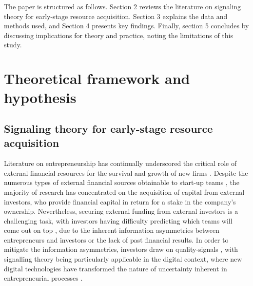 \documentclass[12pt]{article}
\begin{document}
The paper is structured as follows. Section 2 reviews the literature on signaling theory for early-stage resource acquisition. Section 3 explains the data and methods used, and Section 4 presents key findings. Finally, section 5 concludes by discussing implications for theory and practice, noting the limitations of this study.


\section{Theoretical framework and hypothesis}

\subsection{Signaling theory for early-stage resource acquisition}

Literature on entrepreneurship has continually underscored the critical role of external financial resources for the survival and growth of new firms \citep{cooper1994initial}. Despite the numerous types of external financial sources obtainable to start-up teams \citep{drover2017review, klein2020start}, the majority of research has concentrated on the acquisition of capital from external investors, who provide financial capital in return for a stake in the company's ownership. Nevertheless, securing external funding from external investors is a challenging task, with investors having difficulty predicting which teams will come out on top \citep{ghassemiautomated, duhigg2016google}, due to the inherent information asymmetries between entrepreneurs and investors or the lack of past financial results. In order to mitigate the information asymmetries, investors draw on quality-signals \citep{spence1978job, ko2018signaling}, with signalling theory being particularly applicable in the digital context, where new digital technologies have transformed the nature of uncertainty inherent in entrepreneurial processes \citep{nambisan2017digital}.
\end{document}
